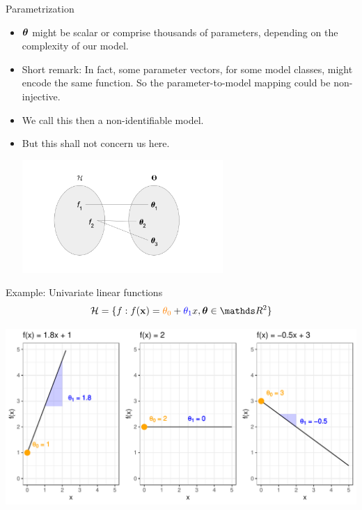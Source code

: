 \documentclass[11pt,compress,t,notes=noshow, xcolor=table]{beamer}
\begin{document}
\begin{vbframe}{Parametrization}
\begin{itemize}
  \item $\bm{\theta}$ might be scalar or comprise thousands of parameters,
  depending on the complexity of our model.
  

 \framebreak
  
  \item Short remark: In fact, some parameter vectors, for some model classes, might
      encode the same function. So the parameter-to-model mapping could 
      be non-injective. 
    \item We call this then a non-identifiable model.
    \item But this shall not concern us here.

  \begin{center}
      \includegraphics[width = 0.6\textwidth]{figure_man/bijection_f_theta_2.PNG} 
  \end{center}

\end{itemize}
\end{vbframe}



\begin{vbframe}{Example: Univariate linear functions}
$$\Hspace = \{f: \fx = \textcolor{orange}{\theta_0} + 
\textcolor{blue}{\theta_1} x, \thetab \in \R^2\}$$

\begin{center}
  \includegraphics[width = \textwidth]{figure/hs-lin-functions.pdf}
\end{center}

\end{vbframe}
\end{document}
